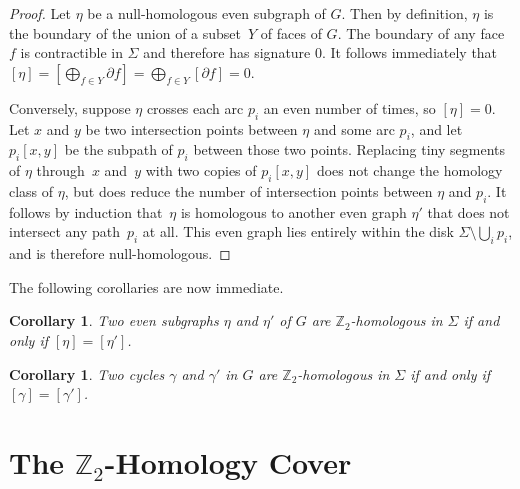 \documentclass[twoside,leqno,twocolumn]{article}
\def\Z{\mathbb{Z}}
\let\cycle\gamma
\def\dualarc{p}
\newtheorem{corollary}[theorem]{Corollary}
\begin{document}
\begin{proof}
Let $\eta$ be a null-homologous even subgraph of $G$.  Then by definition, $\eta$ is the boundary of the union of a subset~$Y$ of faces of $G$.  The boundary of any face $f$ is contractible in $\Sigma$ and therefore has signature $0$.  It follows immediately that $[\eta] = [\bigoplus_{f\in Y} \partial f] = \bigoplus_{f\in Y} [\partial f] = 0$.

Conversely, suppose $\eta$ crosses each arc $\dualarc_i$ an even number of times, so $[\eta]=0$.  Let $x$ and $y$ be two intersection points between $\eta$ and some arc $\dualarc_i$, and let $\dualarc_i[x,y]$ be the subpath of $\dualarc_i$ between those two points.  Replacing tiny segments of $\eta$ through~$x$ and~$y$ with two copies of $\dualarc_i[x,y]$ does not change the homology class of $\eta$, but does reduce the number of intersection points between $\eta$ and $\dualarc_i$.  It follows by induction that~$\eta$ is homologous to another even graph $\eta'$ that does not intersect any path~$\dualarc_i$ at all.  This even graph lies entirely within the disk $\Sigma\setminus \bigcup_i\dualarc_i$, and is therefore null-homologous.
\end{proof}


The following corollaries are now immediate.

\begin{corollary}
Two even subgraphs $\eta$ and $\eta'$ of $G$ are $\Z_2$-homologous in $\Sigma$ if and only if $[\eta] = [\eta']$.
\end{corollary}

\begin{corollary}
Two cycles $\cycle$ and $\cycle'$ in $G$ are $\Z_2$-homologous in $\Sigma$ if and only if $[\cycle] = [\cycle']$.
\end{corollary}




\section{\boldmath The $\Z_2$-Homology Cover}
\label{S:cover}
\end{document}
